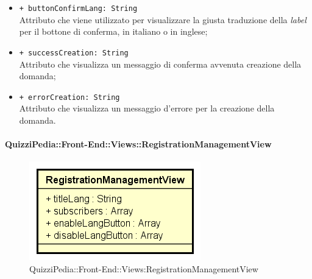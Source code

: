 \begin{itemize}
\begin{itemize}
			\item \texttt{+ buttonConfirmLang: String} \\ Attributo che viene utilizzato per visualizzare la giusta traduzione della \textit{label} per il bottone di conferma, in italiano o in inglese;
			\item \texttt{+ successCreation: String} \\ Attributo che visualizza un messaggio di conferma avvenuta creazione della domanda;
			\item \texttt{+ errorCreation: String} \\ Attributo che visualizza un messaggio d'errore per la creazione della domanda.
		\end{itemize}
\end{itemize}


\paragraph{QuizziPedia::Front-End::Views::RegistrationManagementView}
\begin{figure} [ht]
	\centering
	\includegraphics[scale=0.80]{UML/Classi/Front-End/QuizziPedia_Front-end_RegistrationManagementView.png}
	\caption{QuizziPedia::Front-End::Views:RegistrationManagementView}
\end{figure} \FloatBarrier
